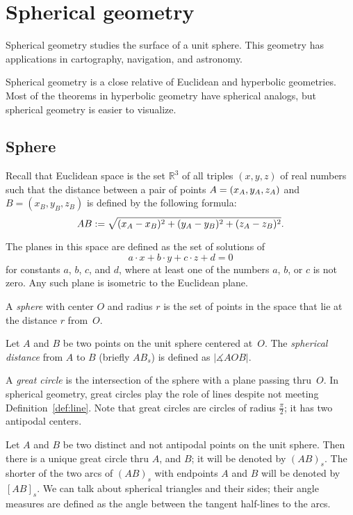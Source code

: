 \chapter{Spherical geometry}
\label{chap:sphere}

Spherical geometry studies the surface of a unit sphere.
This geometry has applications in cartography, navigation, and astronomy.

Spherical geometry is a close relative of Euclidean and hyperbolic geometries.
Most of the theorems in hyperbolic geometry have spherical analogs,
but spherical geometry is easier to visualize. 

\section{Sphere}

Recall that Euclidean space is the set $\mathbb{R}^3$ of all triples $(x,y,z)$ of real numbers
such that the distance between a pair of points
$A=(x_A,y_A,z_A)$ and $B=(x_B,y_B,z_B)$
is defined by the following formula:
$$AB
:=
\sqrt{(x_A-x_B)^2+(y_A-y_B)^2+(z_A-z_B)^2}.$$

The planes in this space are defined as the set of solutions of 
$$a\cdot x+b\cdot y+c\cdot z+d=0$$ 
for constants $a$, $b$, $c$, and $d$, where at least one of the numbers $a$, $b$, or $c$ is not zero.
Any such plane is isometric to the Euclidean plane.

A \emph{sphere} with center $O$ and radius $r$ is the set of points in the space that lie at the distance $r$ from~$O$.

Let $A$ and $B$ be two points on the unit sphere centered at~$O$.
The \emph{spherical distance} from $A$ to $B$
(briefly $AB_s$)
 is defined as  $|\measuredangle AOB|$. 

A \emph{great circle} is the intersection of the sphere with a plane passing thru~$O$.
In spherical geometry, great circles play the role of lines despite not meeting Definition~\ref{def:line}.
Note that great circles are circles of radius $\tfrac\pi2$;
it has two antipodal centers.

Let $A$ and $B$ be two distinct and not antipodal points on the unit sphere.
Then there is a unique great circle thru $A$, and $B$;
it will be denoted by $(AB)_s$.
The shorter of the two arcs of $(AB)_s$ with endpoints $A$ and $B$ will be denoted by $[AB]_s$.
We can talk about spherical triangles and their sides;
their angle measures are defined as the angle between the tangent half-lines to the arcs.

